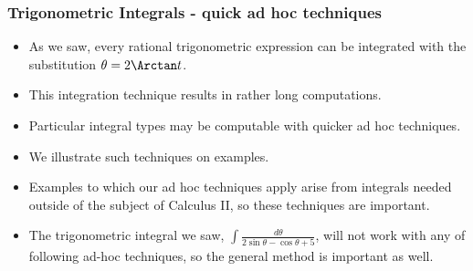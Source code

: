 \begin{frame}
\frametitle{Trigonometric Integrals - quick ad hoc techniques}
\begin{itemize}
\item As we saw, every rational trigonometric expression can be integrated with the substitution $\theta=2\Arctan t$.
\item<2-> This integration technique results in rather long computations. 
\item<3-> Particular integral types may be computable with quicker ad hoc techniques.
\item<4-> We illustrate such techniques on examples. 
\item<5-> Examples to which our ad hoc techniques apply arise from integrals needed outside of the subject of Calculus II, so these techniques are important.
\item<6-> The trigonometric integral we saw, $\int \frac{d\theta}{2\sin \theta -\cos\theta+5}$, will not work with any of following ad-hoc techniques, so the general method is important as well.
\end{itemize}
\end{frame}

